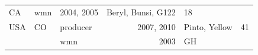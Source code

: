 \documentclass[fleqn,10pt,lineno]{wlpeerj} %
\theoremstyle{definition}
\theoremstyle{definition}
\theoremstyle{definition}
\theoremstyle{remark}
\begin{document}
\begin{longtable}[]{@{}lllrlr@{}}
\begin{minipage}[t]{0.08\columnwidth}
CA\strut
\end{minipage} & \begin{minipage}[t]{0.12\columnwidth}\raggedright\strut
wmn\strut
\end{minipage} & \begin{minipage}[t]{0.19\columnwidth}\raggedleft\strut
2004, 2005\strut
\end{minipage} & \begin{minipage}[t]{0.29\columnwidth}\raggedright\strut
Beryl, Bunsi, G122\strut
\end{minipage} & \begin{minipage}[t]{0.04\columnwidth}\raggedleft\strut
18\strut
\end{minipage}\tabularnewline
\begin{minipage}[t]{0.11\columnwidth}\raggedright\strut
USA\strut
\end{minipage} & \begin{minipage}[t]{0.08\columnwidth}\raggedright\strut
CO\strut
\end{minipage} & \begin{minipage}[t]{0.12\columnwidth}\raggedright\strut
producer\strut
\end{minipage} & \begin{minipage}[t]{0.19\columnwidth}\raggedleft\strut
2007, 2010\strut
\end{minipage} & \begin{minipage}[t]{0.29\columnwidth}\raggedright\strut
Pinto, Yellow\strut
\end{minipage} & \begin{minipage}[t]{0.04\columnwidth}\raggedleft\strut
41\strut
\end{minipage}\tabularnewline
\begin{minipage}[t]{0.11\columnwidth}\raggedright\strut
\strut
\end{minipage} & \begin{minipage}[t]{0.08\columnwidth}\raggedright\strut
\strut
\end{minipage} & \begin{minipage}[t]{0.12\columnwidth}\raggedright\strut
wmn\strut
\end{minipage} & \begin{minipage}[t]{0.19\columnwidth}\raggedleft\strut
2003\strut
\end{minipage} & \begin{minipage}[t]{0.29\columnwidth}\raggedright\strut
GH\strut
\end{minipage} & \begin{minipage}[t]{0.04\columnwidth}\raggedleft\strut

\end{minipage}
\end{longtable}
\end{document}

